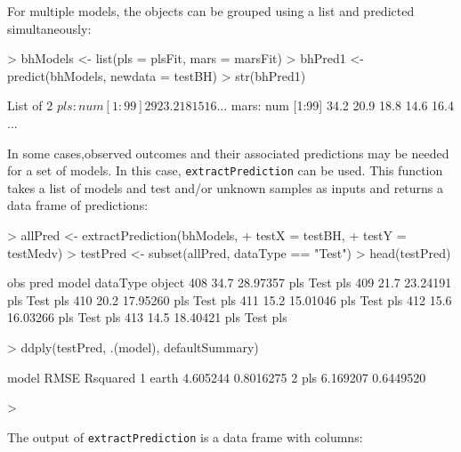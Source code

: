 \documentclass[12pt]{article}
\newcommand{\code}[1]{\mbox{\footnotesize\color{darkblue}\texttt{#1}}}
\renewenvironment{Schunk}{\vspace{\topsep}}{\vspace{\topsep}}
\begin{document}
For multiple models, the objects can be grouped using a list and predicted simultaneously:
\begin{small}
\begin{Schunk}
\begin{Sinput}
> bhModels <- list(pls = plsFit, mars = marsFit)
> bhPred1 <- predict(bhModels, newdata = testBH)
> str(bhPred1)
\end{Sinput}
\begin{Soutput}
List of 2
 $ pls : num [1:99] 29 23.2 18 15 16 ...
 $ mars: num [1:99] 34.2 20.9 18.8 14.6 16.4 ...
\end{Soutput}
\end{Schunk}
\end{small}
In some cases,observed outcomes and their associated predictions may
be needed for a set of models. In this case,
\code{extractPrediction} can be used. This function takes a list of
models and test and/or unknown samples as inputs and returns a data
frame of predictions: 
\begin{small}
\begin{Schunk}
\begin{Sinput}
> allPred <- extractPrediction(bhModels,
+                              testX = testBH,
+                              testY = testMedv)
> testPred <- subset(allPred, dataType == "Test")
> head(testPred)
\end{Sinput}
\begin{Soutput}
     obs     pred model dataType object
408 34.7 28.97357   pls     Test    pls
409 21.7 23.24191   pls     Test    pls
410 20.2 17.95260   pls     Test    pls
411 15.2 15.01046   pls     Test    pls
412 15.6 16.03266   pls     Test    pls
413 14.5 18.40421   pls     Test    pls
\end{Soutput}
\begin{Sinput}
> ddply(testPred, .(model), defaultSummary)
\end{Sinput}
\begin{Soutput}
  model     RMSE  Rsquared
1 earth 4.605244 0.8016275
2   pls 6.169207 0.6449520
\end{Soutput}
\begin{Sinput}
> 
\end{Sinput}
\end{Schunk}
\end{small}
The output of \code{extractPrediction} is a data frame with columns:
\end{document}
